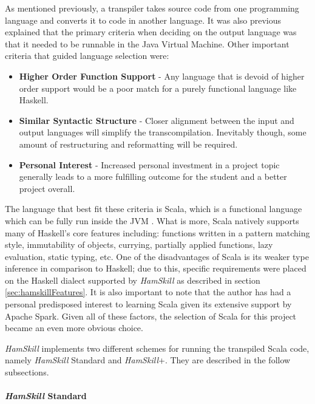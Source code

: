 \documentclass{report}
\newcommand{\myparagraph}[1]{\paragraph{#1}\mbox{}\\}
\begin{document}
As mentioned previously, a transpiler takes source code from one programming language and converts it to code in another language.  It was also previous explained that the primary criteria when deciding on the output language was that it needed to be runnable in the Java Virtual Machine.  Other important criteria that guided language selection were:

\begin{itemize}

	\item \textbf{Higher Order Function Support} - Any language that is devoid of higher order support would be a poor match for a purely functional language like Haskell.
	
	\item \textbf{Similar Syntactic Structure} - Closer alignment between the input and output languages will simplify the transcompilation.  Inevitably though, some amount of restructuring and reformatting will be required.  
	
	\item \textbf{Personal Interest} - Increased personal investment in a project topic generally leads to a more fulfilling outcome for the student and a better project overall.  

\end{itemize}

The language that best fit these criteria is Scala, which is a functional language which can be fully run inside the JVM \cite{whatIsScala}. What is more, Scala natively supports many of Haskell's core features including: functions written in a pattern matching style, immutability of objects, currying, partially applied functions, lazy evaluation, static typing, etc.  One of the disadvantages of Scala is its weaker type inference in comparison to Haskell; due to this, specific requirements were placed on the Haskell dialect supported by \textit{HamSkill} as described in section \ref{sec:hamskillFeatures}.  It is also important to note that the author has had a personal predisposed interest to learning Scala given its extensive support by Apache Spark.  Given all of these factors, the selection of Scala for this project became an even more obvious choice.

\textit{HamSkill} implements two different schemes for running the transpiled Scala code, namely \textit{HamSkill} Standard and \textit{HamSkill}+.  They are described in the follow subsections.

\myparagraph{\textit{HamSkill} Standard}
\end{document}
